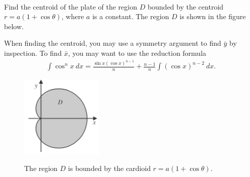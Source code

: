 \item %
 \\
Find the centroid of the plate of the region $D$ bounded by the centroid $r=a(1+\cos\theta)$, where $a$ is a constant. The region $D$ is shown in the figure below.  

When finding the centroid, you may use a symmetry argument to find $\bar{y}$ by inspection. To find $\bar{x}$, you may want to use the reduction formula
\begin{align*}
  \int \cos^n x \ dx = \frac{\sin x(\cos x)^{n-1}}{n}+\frac{n-1}{n} \int(\cos x)^{n-2} \ dx.
\end{align*}
\begin{figure}[H]
  \vspace{-1pt}
  \begin{center}
    \includegraphics[width=0.35\textwidth]{ImgCardioid.jpg}
  \end{center}
 \begin{quote} \caption{\label{FigCircPlate}\small{The region $D$ is bounded by the cardioid $r=a(1+\cos\theta)$.}}\end{quote}
\end{figure}

\EEN %





